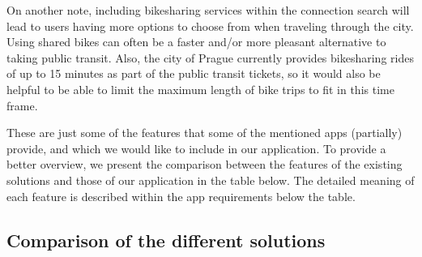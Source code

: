 On another note, including bikesharing services within the connection search will lead to users having more options to choose from when traveling through the city. Using shared bikes can often be a faster and/or more pleasant alternative to taking public transit. Also, the city of Prague currently provides bikesharing rides of up to 15 minutes as part of the public transit tickets, so it would also be helpful to be able to limit the maximum length of bike trips to fit in this time frame.

These are just some of the features that some of the mentioned apps (partially) provide, and which we would like to include in our application. To provide a better overview, we present the comparison between the features of the existing solutions and those of our application in the table below. The detailed meaning of each feature is described within the app requirements below the table.

\subsection{Comparison of the different solutions}


